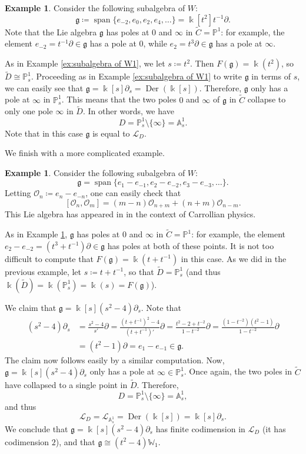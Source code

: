 \documentclass[12pt]{amsart}
\theoremstyle{plain}
\theoremstyle{definition}
\newtheorem{example}[theorem]{Example}
\numberwithin{equation}{section}
\def\g{\mathfrak{g}}
\def\L{\mathcal{L}}
\def\O{\mathcal{O}}
\def\Aa{\mathbb{A}}
\def\PP{\mathbb{P}}
\def\WW{\mathbb{W}}
\def\kk{\Bbbk}
\DeclareMathOperator{\Der}{Der}
\DeclareMathOperator{\spn}{span}
\def\del{\partial}
\begin{document}
\begin{example}\label{ex:easy example}
    Consider the following subalgebra of $W$:
    $$\g \coloneqq \spn\{e_{-2},e_0,e_2,e_4,\ldots\} = \kk[t^2]t^{-1}\del.$$
    Note that the Lie algebra $\g$ has poles at $0$ and $\infty$ in $\widetilde{C} = \PP^1$: for example, the element $e_{-2} = t^{-1}\del \in \g$ has a pole at $0$, while $e_2 = t^3\del \in \g$ has a pole at $\infty$.

    As in Example \ref{ex:subalgebra of W1}, we let $s \coloneqq t^2$. Then $F(\g) = \kk(t^2)$, so $\widetilde{D} \cong \PP^1_s$. Proceeding as in Example \ref{ex:subalgebra of W1} to write $\g$ in terms of $s$, we can easily see that $\g = \kk[s]\del_s = \Der(\kk[s])$. Therefore, $\g$ only has a pole at $\infty$ in $\PP^1_s$. This means that the two poles $0$ and $\infty$ of $\g$ in $\widetilde{C}$ collapse to only one pole $\infty$ in $\widetilde{D}$. In other words, we have
    $$D = \PP^1_s \setminus \{\infty\} = \Aa^1_s.$$
    Note that in this case $\g$ is equal to $\L_D$.
\end{example}

We finish with a more complicated example.

\begin{example}\label{ex:harder example}
    Consider the following subalgebra of $W$:
    $$\g = \spn\{e_1 - e_{-1}, e_2 - e_{-2}, e_3 - e_{-3}, \ldots\}.$$
    Letting $\O_n \coloneqq e_n - e_{-n}$, one can easily check that
    $$[\O_n,\O_m] = (m - n)\O_{n + m} + (n + m)\O_{n - m}.$$
    This Lie algebra has appeared in \cite{BagchiChakrabortyChakraborttyFredenhagenGrumillerPandit, BCCA} in the context of Carrollian physics.
    
    As in Example \ref{ex:easy example}, $\g$ has poles at $0$ and $\infty$ in $\widetilde{C} = \PP^1$: for example, the element $e_2 - e_{-2} = (t^3 + t^{-1})\del \in \g$ has poles at both of these points. It is not too difficult to compute that $F(\g) = \kk(t + t^{-1})$ in this case. As we did in the previous example, let $s \coloneqq t + t^{-1}$, so that $\widetilde{D} = \PP^1_s$ (and thus $\kk(\widetilde{D}) = \kk(\PP^1_s) = \kk(s) = F(\g)$).
    
    We claim that $\g = \kk[s](s^2 - 4)\del_s$. Note that
    \begin{align*}
        (s^2 - 4)\del_s &= \frac{s^2 - 4}{s'}\del = \frac{(t + t^{-1})^2 - 4}{(t + t^{-1})'}\del = \frac{t^2 - 2 + t^{-2}}{1 - t^{-2}}\del = \frac{(1 - t^{-2})(t^2 - 1)}{1 - t^{-2}}\del \\
        &= (t^2 - 1)\del = e_1 - e_{-1} \in \g.
    \end{align*}
    The claim now follows easily by a similar computation. Now, $\g = \kk[s](s^2 - 4)\del_s$ only has a pole at $\infty \in \PP^1_s$. Once again, the two poles in $\widetilde{C}$ have collapsed to a single point in $\widetilde{D}$. Therefore,
    $$D = \PP^1_s \setminus \{\infty\} = \Aa^1_s,$$
    and thus
    $$\L_D = \L_{\Aa^1_s} = \Der(\kk[s]) = \kk[s]\del_s.$$
    We conclude that $\g = \kk[s](s^2 - 4)\del_s$ has finite codimension in $\L_D$ (it has codimension $2$), and that $\g \cong (t^2 - 4)\WW_1$.
\end{example}
\end{document}
